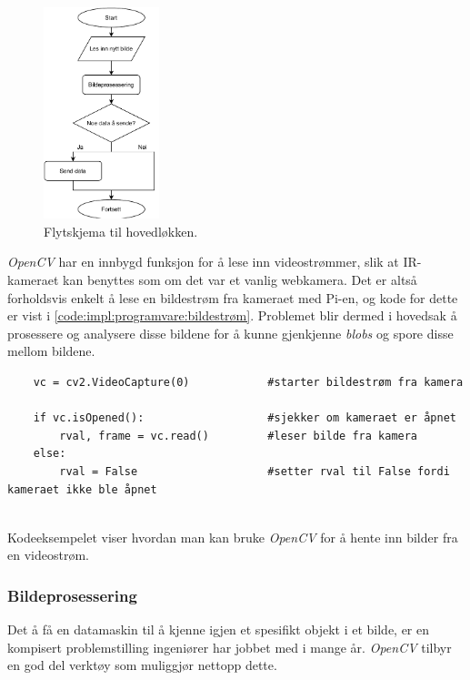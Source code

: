 \begin{figure}[H]
    \centering
    \includegraphics[width=0.3\textwidth]{implementering/Program/main_loop.pdf}
    \caption{Flytskjema til hovedløkken.}
    \label{fig:hovedprogram_loop}
\end{figure}

\textit{OpenCV} har en innbygd funksjon for å lese inn videostrømmer, slik at IR-kameraet kan benyttes som om det var et vanlig webkamera. 
Det er altså forholdsvis enkelt å lese en bildestrøm fra kameraet med Pi-en, og kode for dette er vist i \autoref{code:impl:programvare:bildestrøm}. 
Problemet blir dermed i hovedsak å prosessere og analysere disse bildene for å kunne gjenkjenne \textit{blobs} og spore disse mellom bildene.

\begin{listing}[!htb]
\begin{verbatim}
    vc = cv2.VideoCapture(0)            #starter bildestrøm fra kamera
    
    if vc.isOpened():                   #sjekker om kameraet er åpnet
        rval, frame = vc.read()         #leser bilde fra kamera
    else:
        rval = False                    #setter rval til False fordi kameraet ikke ble åpnet
    
\end{verbatim}
\caption{Kodeeksempelet viser hvordan man kan bruke \textit{OpenCV} for å hente inn bilder fra en videostrøm.}
\label{code:impl:programvare:bildestrøm}
\end{listing}


\subsubsection{Bildeprosessering}\label{sec:impl:programvare:bildepro}

Det å få en datamaskin til å kjenne igjen et spesifikt objekt i et bilde, er en kompisert problemstilling ingeniører har jobbet med i mange år.
\textit{OpenCV} tilbyr en god del verktøy som muliggjør nettopp dette.

